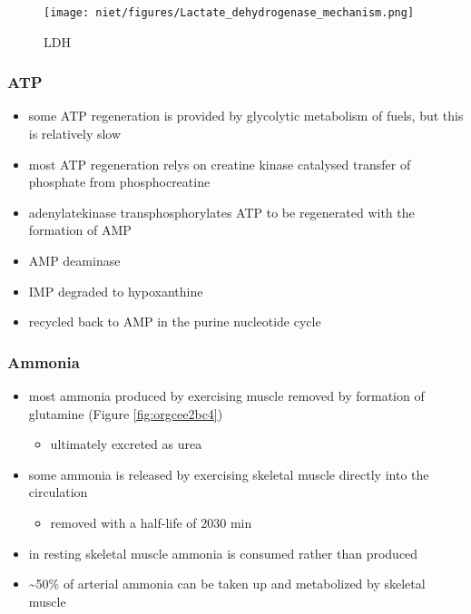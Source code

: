 \documentclass[12pt]{scrartcl}
\begin{document}
\begin{figure}[htbp]
\centering
\texttt{[image: niet/figures/Lactate\_dehydrogenase\_mechanism.png]}
\caption{\label{fig:org16238ee}LDH}
\end{figure}

\subsubsection{ATP}
\label{sec:org2089893}
\begin{itemize}
\item some ATP regeneration is provided by glycolytic metabolism of fuels,
but this is relatively slow
\item most ATP regeneration relys on creatine kinase catalysed transfer of
phosphate from phosphocreatine
\end{itemize}


\begin{itemize}
\item adenylatekinase transphosphorylates ATP to be regenerated with the formation
of AMP


\item AMP deaminase
\end{itemize}


\begin{itemize}
\item IMP degraded to hypoxanthine
\item recycled back to AMP in the purine nucleotide cycle
\end{itemize}

\subsubsection{Ammonia}
\label{sec:org5816a40}
\begin{itemize}
\item most ammonia produced by exercising muscle removed by formation of glutamine (Figure \ref{fig:orgcee2bc4})
\begin{itemize}
\item ultimately excreted as urea
\end{itemize}
\item some ammonia is released by exercising skeletal muscle directly into the circulation
\begin{itemize}
\item removed with a half-life of 20\textpm{}30 min
\end{itemize}
\item in resting skeletal muscle ammonia is consumed rather than produced
\item \textasciitilde{}50\% of arterial ammonia can be taken up and metabolized by skeletal muscle
\end{itemize}
\end{document}
